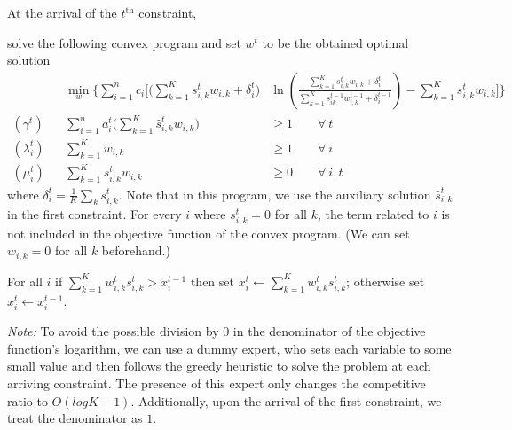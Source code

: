 At the arrival of the $t^{\text{th}}$ constraint,
\begin{compactenum}
	\item solve the following convex program and set $w^t$ to be the obtained optimal solution
%
\begin{align*}
&& \min_{w} \biggl\{\sum_{i=1}^{n} c_{i}  \biggl[  \biggl(\sum_{k=1}^{K} s_{i,k}^{t} w_{i,k}  + \delta_{i}^{t} \biggr) &
					 \ln \left( \frac{\sum_{k=1}^{K} s_{i,k}^{t} w_{i,k}  + \delta_{i}^{t}}{ \sum_{k=1}^{K}  s_{ik}^{t-1}w_{i,k}^{t-1}  + \delta_{i}^{t-1}}  \right)
					 		- \sum_{k=1}^{K}  s_{i,k}^{t} w_{i,k} \biggr] \biggr\} \\
    (\gamma^{t})  && \sum_{i=1}^{n} a_{i}^{t} \biggl( \sum_{k=1}^{K}  \hat{s}_{i,k}^{t} w_{i,k} \biggr) &\geq 1 \qquad \forall\ t\\
%
    (\lambda_{i}^{t}) && \sum_{k=1}^{K}  w_{i,k} &\geq 1 \qquad \forall\ i\\
%
    (\mu_{i}^{t}) && \sum_{k=1}^{K} s_{i,k}^{t} w_{i,k} &\geq 0 \qquad \forall\ i,t
\end{align*}
%
where $\delta_{i}^{t} = \frac{1}{K} \sum_{k} s_{i,k}^{t}$.
Note that in this program, we use the auxiliary solution $\hat{s}_{i,k}^{t}$ in the first constraint. For every $i$ where $s_{i,k}^{t} = 0$ for all $k$, the term related to $i$ is not included in the objective function of the convex program.
(We can set $w_{i,k} = 0$ for all $k$ beforehand.)
	\item For all $i$ if $\sum_{k=1}^{K} w_{i,k}^{t} s_{i,k}^{t} > x_{i}^{t-1}$ then set $x_{i}^{t} \gets \sum_{k=1}^{K} w_{i,k}^{t} s_{i,k}^{t}$;
otherwise set $x_{i}^{t} \gets x_{i}^{t-1}$.
\end{compactenum}

\medskip

\noindent \textit{Note:} To avoid the possible division by 0 in the denominator of the objective function's logarithm, we can use a dummy expert, who sets each variable to some small value and then follows the greedy heuristic to solve the problem at each arriving constraint. The presence of this expert only changes the competitive ratio to $O(log K + 1)$. Additionally, upon the arrival of the first constraint, we treat the denominator as $1$.

